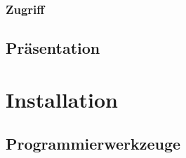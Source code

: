 \documentclass[12pt, oneside, a4paper]{article}		%
\begin{document}
\subsubsection{Zugriff}
\blindtext

\subsection{Präsentation}
\blindtext

\section{Installation}



\subsection{Programmierwerkzeuge}
\end{document}
